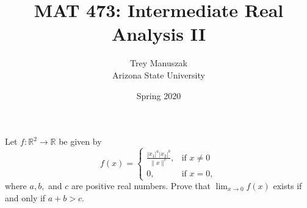\documentclass[12pt]{article}
\title{MAT 473: Intermediate Real Analysis II}
\date{Spring 2020}
\author{Trey Manuszak\\ Arizona State University}
\newenvironment{problem}[2][Problem]{\begin{trivlist}
\item[\hskip \labelsep {\bfseries #1}\hskip \labelsep {\bfseries
#2.}]}{\end{trivlist}}
\begin{document}


\maketitle
\newpage


\begin{problem}{1} Let $f: \mathbb{R}^2 \to \mathbb{R}$ be given by $$f(x) = \begin{cases} 
  \frac{\left|x_1\right|^a \left|x_2\right|^b}{\lVert x \rVert^c}, & \text{if } x \neq 0 \\
  0, & \text{if } x = 0, 
\end{cases}
$$ where $a,b,$ and $c$ are positive real numbers. Prove that $\lim_{x \to 0} f(x)$ exists if and only if $a + b > c$.
\end{problem}
\end{document}
